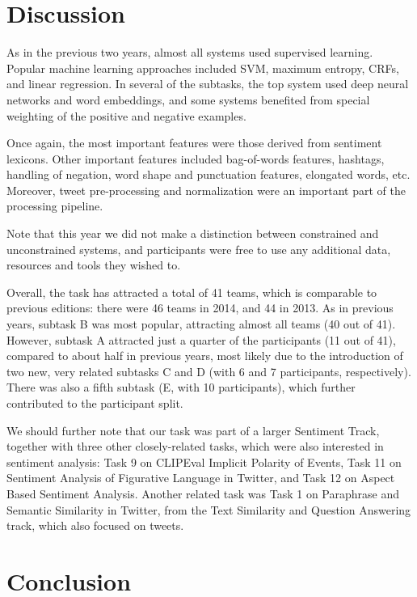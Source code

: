 \documentclass[11pt]{article}
\begin{document}
\section{Discussion}

As in the previous two years, almost all systems used supervised learning.
Popular machine learning approaches included SVM, maximum entropy, CRFs, and linear regression.
In several of the subtasks, the top system used deep neural networks and word embeddings,
and some systems benefited from special weighting of the positive and negative examples.

Once again, the most important features were those derived from sentiment lexicons.
Other important features included bag-of-words features, hashtags, handling of negation, word shape and punctuation features, elongated words, etc.
Moreover, tweet pre-processing and normalization were an important part of the processing pipeline.

Note that this year we did not make a distinction between constrained and unconstrained systems,
and participants were free to use any additional data, resources and tools they wished to.

Overall, the task has attracted a total of 41 teams,
which is comparable to previous editions:
there were 46 teams in 2014, and 44 in 2013.
As in previous years, subtask B was most popular,
attracting almost all teams (40 out of 41).
However, subtask A attracted just a quarter of the participants (11 out of 41),
compared to about half in previous years,
most likely due to the introduction of two new, very related subtasks C and D (with 6 and 7 participants, respectively).
There was also a fifth subtask (E, with 10 participants),
which further contributed to the participant split.


We should further note that our task was part of a larger Sentiment Track,
together with three other closely-related tasks,
which were also interested in sentiment analysis:
Task 9 on CLIPEval Implicit Polarity of Events,
Task 11 on Sentiment Analysis of Figurative Language in Twitter,
and Task 12 on Aspect Based Sentiment Analysis.
Another related task was Task 1 on Paraphrase and Semantic Similarity in Twitter,
from the Text Similarity and Question Answering track,
which also focused on tweets.



\section{Conclusion}
\end{document}
